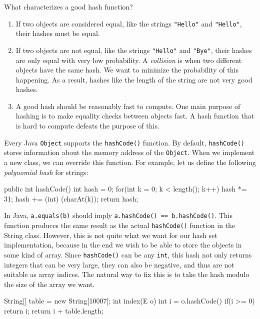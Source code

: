 What characterizes a good hash function?

\begin{enumerate}
\item
If two objects are considered equal, like the strings \texttt{"Hello"} and \texttt{"Hello"}, their hashes must be equal.
\item
If two objects are not equal, like the strings \texttt{"Hello"} and \texttt{"Bye"}, their hashes are only equal with very low probability. A \textit{collision} is when two different objects have the same hash. We want to minimize the probability of this happening. As a result, hashes like the length of the string are not very good hashes.
\item
A good hash should be reasonably fast to compute. One main purpose of hashing is to make equality checks between objects fast. A hash function that is hard to compute defeats the purpose of this.
\end{enumerate}

Every Java \texttt{Object} supports the \texttt{hashCode()} function. By default, \texttt{hashCode()} stores information about the memory address of the \texttt{Object}. When we implement a new class, we can override this function. For example, let us define the following \textit{polynomial hash} for strings:

\begin{mylstlisting}
public int hashCode() {
	int hash = 0;
    for(int k = 0; k < length(); k++) {
		hash *= 31;
        hash += (int) (charAt(k));
    }
    return hash;
}
\end{mylstlisting}

In Java, \texttt{a.equals(b)} should imply \texttt{a.hashCode() == b.hashCode()}. This function produces the same result as the actual \texttt{hashCode()} function in the String class. However, this is not quite what we want for our hash set implementation, because in the end we wish to be able to store the objects in some kind of array. Since \texttt{hashCode()} can be any \texttt{int}, this hash not only returns integers that can be very large, they can also be negative, and thus are not suitable as array indices. The natural way to fix this is to take the hash modulo the size of the array we want.

\begin{mylstlisting}
String[] table = new String[10007];
int index(E o) {
	int i = o.hashCode() %
    if(i >= 0)
    	return i;
	return i + table.length;
}
\end{mylstlisting}


